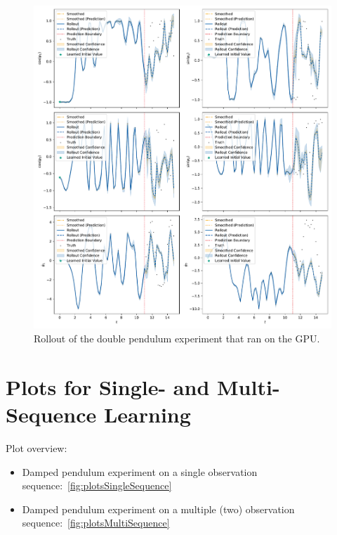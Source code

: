	\begin{figure}
		\centering
		\includegraphics[width=\linewidth]{figures/results/cpu-vs-gpu/acrobot-gpu/rollout-observations-N0.pdf}
		\caption[Rollout of the double pendulum experiment that ran on the GPU]{Rollout of the double pendulum experiment that ran on the GPU.}
		\label{fig:cpuVsGpuGpu}
	\end{figure}

\section{Plots for Single- and Multi-Sequence Learning}
	\label{app:plotsSingleMulti}

	Plot overview:
	\begin{itemize}
		\item Damped pendulum experiment on a single observation sequence:~\autoref{fig:plotsSingleSequence}
		\item Damped pendulum experiment on a multiple (two) observation sequence:~\autoref{fig:plotsMultiSequence}
	\end{itemize}

